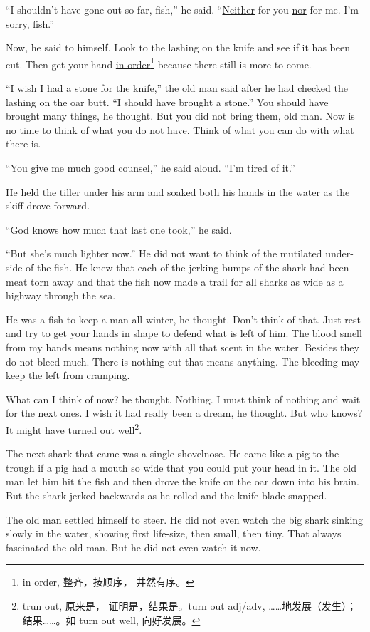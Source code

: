 \documentclass[fontset=ubuntu,zihao=-4]{ctexrep}
\begin{document}
``I shouldn't have gone out so far, fish,'' he said. ``\uline{Neither} for
you \uline{nor} for me. I'm sorry, fish.''

Now, he said to himself. Look to the lashing on the knife and see if it has
been cut. Then get your hand \uline{in order}\footnote{in order, 整齐，按顺序，
  井然有序。} because there still is more to come.

``I wish I had a stone for the knife,'' the old man said after he had
checked the lashing on the oar butt. ``I should have brought a stone.'' You
should have brought many things, he thought. But you did not bring them, old
man. Now is no time to think of what you do not have. Think of what you can
do with what there is.

``You give me much good \gls{counsel},'' he said aloud. ``I'm tired of it.''

He held the tiller under his arm and soaked both his hands in the water as
the skiff drove forward.

``God knows how much that last one took,'' he said.

``But she's much lighter now.'' He did not want to think of the mutilated
under-side of the fish. He knew that each of the jerking \glspl{bump}
of the shark had been meat \gls{torn} away and that the fish now made a
trail for all sharks as wide as a \gls{highway} through the sea.

He was a fish to keep a man all winter, he thought. Don't think of that.
Just rest and try to get your hands in shape to defend what is left of him.
The blood smell from my hands means nothing now with all that scent in the
water. Besides they do not bleed much. There is nothing cut that means
anything. The bleeding may keep the left from cramping.

What can I think of now? he thought. Nothing. I must think of nothing and
wait for the next ones. I wish it had \uline{really} been a dream, he thought.
But who knows? It might have \uline{turned out well}\footnote{trun out, 原来是，
  证明是，结果是。turn out adj/adv, ……地发展（发生）；结果……。如 turn
  out well, 向好发展。}.

The next shark that came was a single shovelnose. He came like a pig to the
trough if a pig had a mouth so wide that you could put your head in it. The
old man let him hit the fish and then drove the knife on the oar down into
his brain. But the shark jerked backwards as he rolled and the knife blade
snapped.

The old man settled himself to steer. He did not even watch the big shark
sinking slowly in the water, showing first \gls{life-size}, then small, then
tiny. That always \gls{fascinated} the old man. But he did not even watch it now.
\end{document}
